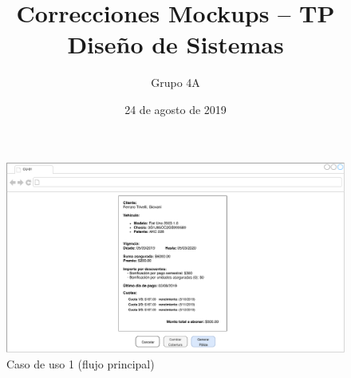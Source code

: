 \documentclass[12pt]{article}
\title{Correcciones Mockups -- TP Diseño de Sistemas}
\author{Grupo 4A}
\date{24 de agosto de 2019}
\begin{document}
		
\begin{titlepage}
\pagestyle{empty}
\center
\pagestyle{empty}
\maketitle
\newpage
\end{titlepage}

\pagestyle{fancy}

\vfill
\begin{figure}[h!]
\includegraphics[width=\textwidth]{CU1/CU-017.pdf}
\caption{Caso de uso 1 (flujo principal)}
\end{figure}
\vfill
\end{document}
